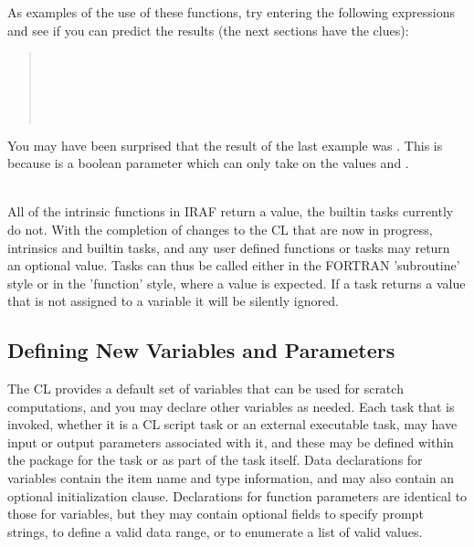 As examples of the use of these functions, try entering the following 
expressions and see if you can predict the results 
(the next sections have the clues):

\begin{quotation}\noindent
{}  \\
\smallskip
{}  \\
\smallskip
{}  \\
\smallskip
{}  \\
\smallskip
{} 
\end{quotation}

\noindent
You may have been surprised that the result of the last example was
.  This is because  is a boolean 
parameter which can only take on the values  and 
.

 \\
All of the intrinsic functions in IRAF return a value, the builtin
tasks currently do not.  With the completion of changes to the CL
that are now in progress, intrinsics and builtin tasks, and any user defined
functions or tasks may return an optional value.  Tasks can thus be
called either in the FORTRAN 'subroutine' style or in the 'function'
style, where a value is expected.  If a task returns a value that is
not assigned to a variable it will be silently ignored.

\subsection{Defining New Variables and Parameters}

The CL provides a default set of variables that can be used for scratch
computations, and you may declare other variables as needed.
Each task that is invoked, whether it is a CL script task
or an external executable task, may have input or output parameters
associated with it, and these may be defined within the package for the 
task or as part of the task itself. Data declarations
for variables contain the item name and type information,
and may also contain an optional initialization clause.  Declarations
for function parameters are identical to those for variables, but they 
may contain optional fields to specify prompt strings, to define a valid 
data range, or to enumerate a list of valid values.

